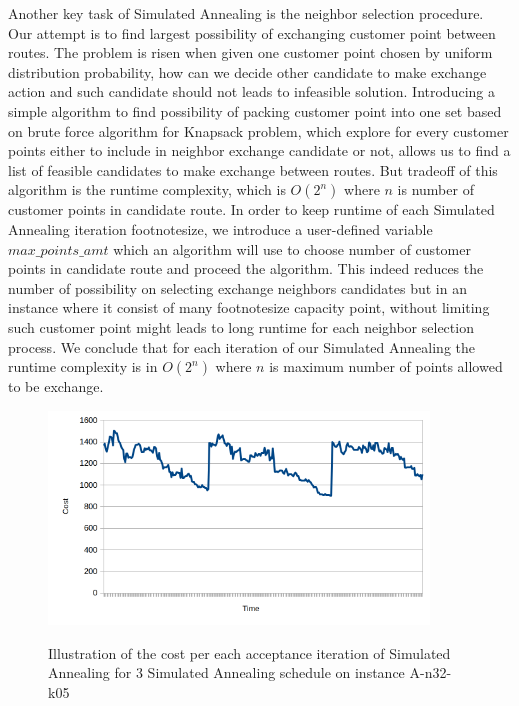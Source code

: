 \documentclass[12pt]{article}
\begin{document}
Another key task of Simulated Annealing is the neighbor selection procedure. Our attempt is to find largest possibility of exchanging customer point between routes. The problem is risen when given one customer point chosen by uniform distribution probability, how can we decide other candidate to make exchange action and such candidate should not leads to infeasible solution. Introducing a simple algorithm to find possibility of packing customer point into one set based on brute force algorithm for Knapsack problem, which explore for every customer points either to include in neighbor exchange candidate or not, allows us to find a list of feasible candidates to make exchange between routes. But tradeoff of this algorithm is the runtime complexity, which is $O(2^n)$ where $n$ is number of customer points in candidate route. In order to keep runtime of each Simulated Annealing iteration footnotesize, we introduce a user-defined variable $max\_points\_amt$ which an algorithm will use to choose number of customer points in candidate route and proceed the algorithm. This indeed reduces the number of possibility on selecting exchange neighbors candidates but in an instance where it consist of many footnotesize capacity point, without limiting such customer point might leads to long runtime for each neighbor selection process. We conclude that for each iteration of our Simulated Annealing the runtime complexity is in $O(2^n)$ where $n$ is maximum number of points allowed to be exchange.

\begin{figure}[!h]
	\caption{Illustration of the cost per each acceptance iteration of Simulated Annealing for 3 Simulated Annealing schedule on instance A-n32-k05}
	\centering
	\includegraphics[width=0.9\textwidth]{A-n32-k05-sa-cost.png}
	\label{fig:A-n32-k05-sa-cost}
\end{figure}
\end{document}
